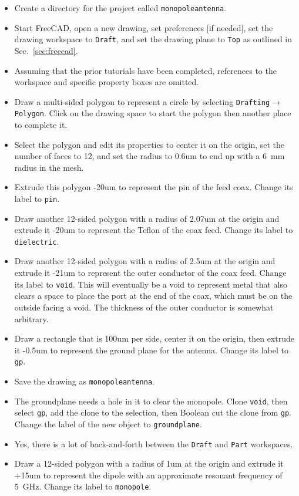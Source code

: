 \documentclass[titlepage]{article}
\renewcommand\_{\textunderscore\linebreak[1]}
\begin{document}
\begin{itemize}
\item Create a directory for the project called \texttt{monopole\_antenna}.
\item Start FreeCAD, open a new drawing, set preferences [if needed], set the drawing workspace to \texttt{Draft}, and set the drawing plane to \texttt{Top} as outlined in Sec.~\ref{sec:freecad}.
\item Assuming that the prior tutorials have been completed, references to the workspace and specific property boxes are omitted.
\item Draw a multi-sided polygon to represent a circle by selecting \texttt{Drafting}$\rightarrow$\texttt{Polygon}.  Click on the drawing space to start the polygon then another place to complete it.
\item Select the polygon and edit its properties to center it on the origin, set the number of faces to 12, and set the radius to 0.6um to end up with a 6~mm radius in the mesh.
\item Extrude this polygon -20um to represent the pin of the feed coax.  Change its label to \texttt{pin}.
\item Draw another 12-sided polygon with a radius of 2.07um at the origin and extrude it -20um to represent the Teflon of the coax feed.  Change its label to \texttt{dielectric}.
\item Draw another 12-sided polygon with a radius of 2.5um at the origin and extrude it -21um to represent the outer conductor of the coax feed.  Change its label to \texttt{void}. This will eventually be a void to represent metal that also clears a space to place the port at the end of the coax, which must be on the outside facing a void.  The thickness of the outer conductor is somewhat arbitrary.
\item Draw a rectangle that is 100um per side, center it on the origin, then extrude it -0.5um to represent the ground plane for the antenna. Change its label to \texttt{gp}.
\item Save the drawing as \texttt{monopole\_antenna}.
\item The groundplane needs a hole in it to clear the monopole.  Clone \texttt{void}, then select \texttt{gp}, add the clone to the selection, then Boolean cut the clone from \texttt{gp}.  Change the label of the new object to \texttt{groundplane}.
\item Yes, there is a lot of back-and-forth between the \texttt{Draft} and \texttt{Part} workspaces.
\item Draw a 12-sided polygon with a radius of 1um at the origin and extrude it +15um to represent the dipole with an approximate resonant frequency of 5~GHz. Change its label to \texttt{monopole}.

\end{itemize}
\end{document}
